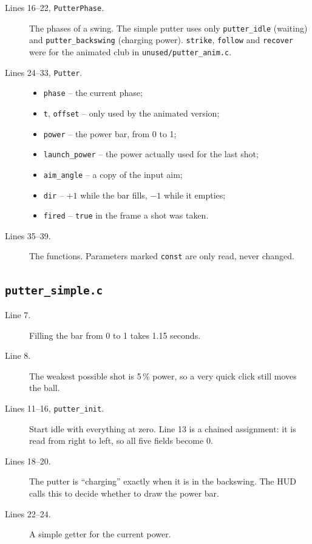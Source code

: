 \documentclass[11pt,a4paper]{article}
\newcommand{\code}[3]{}
\begin{document}
\begin{description}
  \item[Lines 16--22, \texttt{PutterPhase}.] The phases of a swing. The simple putter uses only
  \texttt{putter\_idle} (waiting) and \texttt{putter\_backswing} (charging power). \texttt{strike},
  \texttt{follow} and \texttt{recover} were for the animated club in \texttt{unused/putter\_anim.c}.
  \item[Lines 24--33, \texttt{Putter}.]
  \begin{itemize}
    \item \texttt{phase} -- the current phase;
    \item \texttt{t}, \texttt{offset} -- only used by the animated version;
    \item \texttt{power} -- the power bar, from 0 to 1;
    \item \texttt{launch\_power} -- the power actually used for the last shot;
    \item \texttt{aim\_angle} -- a copy of the input aim;
    \item \texttt{dir} -- $+1$ while the bar fills, $-1$ while it empties;
    \item \texttt{fired} -- \texttt{true} in the frame a shot was taken.
  \end{itemize}
  \item[Lines 35--39.] The functions. Parameters marked \texttt{const} are only read, never changed.
\end{description}

\subsection{\texttt{putter\_simple.c}}

\code{putter_simple.c}{1}{24}

\begin{description}
  \item[Line 7.] Filling the bar from 0 to 1 takes 1.15 seconds.
  \item[Line 8.] The weakest possible shot is 5\,\% power, so a very quick click still moves the ball.
  \item[Lines 11--16, \texttt{putter\_init}.] Start idle with everything at zero. Line 13 is a chained assignment:
  it is read from right to left, so all five fields become 0.
  \item[Lines 18--20.] The putter is ``charging'' exactly when it is in the backswing. The HUD calls this to decide
  whether to draw the power bar.
  \item[Lines 22--24.] A simple getter for the current power.
\end{description}
\end{document}
